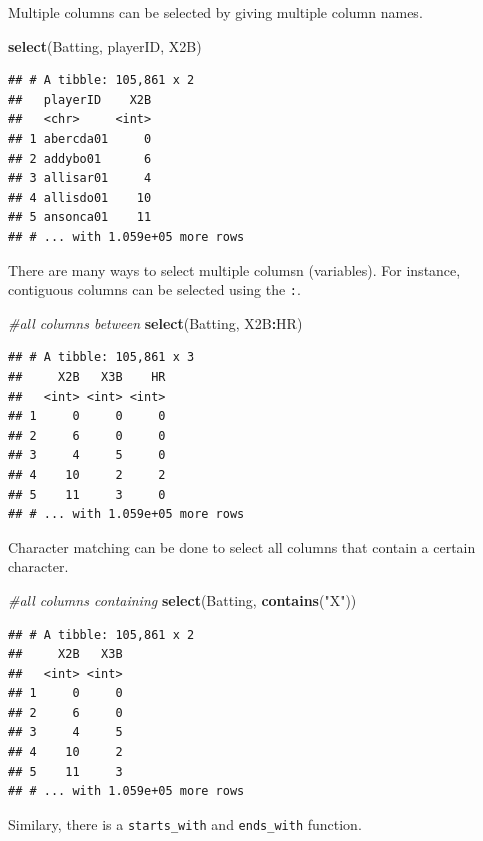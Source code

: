 \documentclass[
]{book}
\newenvironment{Shaded}{\begin{snugshade}}{\end{snugshade}}
\newcommand{\CommentTok}[1]{\textcolor[rgb]{0.56,0.35,0.01}{\textit{#1}}}
\newcommand{\KeywordTok}[1]{\textcolor[rgb]{0.13,0.29,0.53}{\textbf{#1}}}
\newcommand{\NormalTok}[1]{#1}
\newcommand{\OperatorTok}[1]{\textcolor[rgb]{0.81,0.36,0.00}{\textbf{#1}}}
\newcommand{\StringTok}[1]{\textcolor[rgb]{0.31,0.60,0.02}{#1}}
\theoremstyle{definition}
\theoremstyle{definition}
\theoremstyle{definition}
\theoremstyle{remark}
\begin{document}
Multiple columns can be selected by giving multiple column names.

\begin{Shaded}
\begin{Highlighting}[]
\KeywordTok{select}\NormalTok{(Batting, playerID, X2B)}
\end{Highlighting}
\end{Shaded}

\begin{verbatim}
## # A tibble: 105,861 x 2
##   playerID    X2B
##   <chr>     <int>
## 1 abercda01     0
## 2 addybo01      6
## 3 allisar01     4
## 4 allisdo01    10
## 5 ansonca01    11
## # ... with 1.059e+05 more rows
\end{verbatim}

There are many ways to select multiple columsn (variables). For instance, contiguous columns can be selected using the \texttt{:}.

\begin{Shaded}
\begin{Highlighting}[]
\CommentTok{#all columns between}
\KeywordTok{select}\NormalTok{(Batting, X2B}\OperatorTok{:}\NormalTok{HR)}
\end{Highlighting}
\end{Shaded}

\begin{verbatim}
## # A tibble: 105,861 x 3
##     X2B   X3B    HR
##   <int> <int> <int>
## 1     0     0     0
## 2     6     0     0
## 3     4     5     0
## 4    10     2     2
## 5    11     3     0
## # ... with 1.059e+05 more rows
\end{verbatim}

Character matching can be done to select all columns that contain a certain character.

\begin{Shaded}
\begin{Highlighting}[]
\CommentTok{#all columns containing}
\KeywordTok{select}\NormalTok{(Batting, }\KeywordTok{contains}\NormalTok{(}\StringTok{"X"}\NormalTok{))}
\end{Highlighting}
\end{Shaded}

\begin{verbatim}
## # A tibble: 105,861 x 2
##     X2B   X3B
##   <int> <int>
## 1     0     0
## 2     6     0
## 3     4     5
## 4    10     2
## 5    11     3
## # ... with 1.059e+05 more rows
\end{verbatim}

Similary, there is a \texttt{starts\_with} and \texttt{ends\_with} function.
\end{document}
